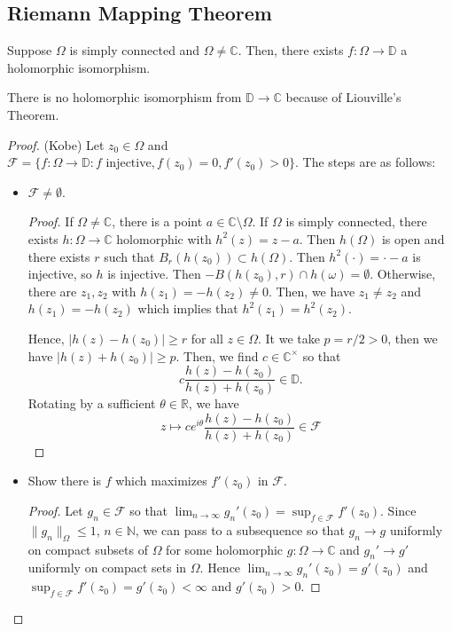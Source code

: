 \documentclass[12pt]{scrartcl}
\newcommand{\N}{\mathbb{N}}
\newcommand{\R}{\mathbb{R}}
\newcommand{\C}{\mathbb C}
\let \mc \mathcal
\begin{document}
\subsection{Riemann Mapping Theorem}
\begin{thm} Suppose $\Omega$ is simply connected and $\Omega \ne \C$.  Then, there exists $f:\Omega \to \mathbb D$ a holomorphic isomorphism.  
\end{thm}
\begin{remark} There is no holomorphic isomorphism from $\mathbb D \to \C$ because of Liouville's Theorem.  
\end{remark}
\begin{proof}(Kobe) Let $z_0 \in \Omega$ and $\mc F = \{f : \Omega \to \mathbb D : f \text{ injective}, f(z_0) = 0, f'(z_0) > 0\}$.
The steps are as follows:
\begin{itemize}
\item $\mc F \ne \emptyset$.
\begin{proof}
If $\Omega \ne \C$, there is a point $a \in \C \setminus \Omega$. If $\Omega$ is simply connected, there exists $h: \Omega \to \C$ holomorphic with $h^2(z) = z - a$.  Then $h(\Omega)$ is open and there exists $r$ such that $B_r(h(z_0)) \subset h(\Omega)$.    Then $h^2(\cdot) = \cdot - a$ is injective, so $h$ is injective.  Then $-B(h(z_0), r) \cap h(\omega)  = \emptyset$.  Otherwise, there are $z_1, z_2$ with $h(z_1) = -h(z_2) \ne 0$. Then, we have $z_1 \ne z_2$ and $h(z_1) = -h(z_2)$ which implies that $h^2(z_1) = h^2(z_2)$.

Hence, $|h(z) - h(z_0)| \ge r$ for all $z \in \Omega$.  It we take $p = r/2 > 0$, then we have $|h(z) + h(z_0)| \ge p$.  Then, we find $c \in \C^\times$ so that 
$$c \frac{h(z) - h(z_0)}{h(z) + h(z_0)} \in \mathbb D.$$
Rotating by a sufficient $\theta \in \R$, we have $$z \mapsto c e^{i\theta} \frac{h(z) - h(z_0)}{h(z) + h(z_0)} \in \mc F$$
\end{proof}
\item Show there is $f$ which maximizes $f'(z_0)$ in $\mc F$.
\begin{proof}
Let $g_n \in \mc F$ so that $\lim_{n \to \infty} g_n'(z_0) = \sup_{f \in \mc F} f'(z_0)$.  Since $\|g_n\|_\Omega \le 1$, $n \in \N$, we can pass to a subsequence so that $g_n \to g$ uniformly on compact subsets of $\Omega$ for some holomorphic $g: \Omega \to \C$ and $g_n' \to g'$ uniformly on compact sets in $\Omega$.  Hence $\lim_{n \to \infty} g_n'(z_0) = g'(z_0)$ and $\sup_{f \in \mc F} f'(z_0) = g'(z_0) < \infty$ and $g'(z_0) > 0$.  


\end{proof}
\end{itemize}
\end{proof}
\end{document}
